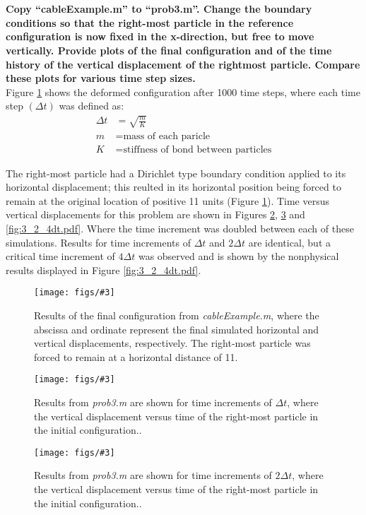 \documentclass[letterpaper, 10pt, oneside]{article}
\newenvironment{dd}[1]{
	\noindent
	\textbf{\normalsize{#1}}
	\hspace{0.1in}
	\small
	\rmfamily
	}
	{\medskip}
\newcommand{\as}[1]{\begin{align*}#1\end{align*}}
\newcommand{\bdd}{\begin{dd}}
\newcommand{\edd}{\end{dd}}
\newcommand{\Figure}[4]{
  \begin{figure}[#1]
    \centering
    \texttt{[image: figs/\#3]}
    \caption{#4.}\label{fig:#3}
  \end{figure}}
\begin{document}
\edd


\section{}
\bdd{Copy “cableExample.m” to “prob3.m”. Change the boundary conditions so that the right-most particle in the reference configuration is now fixed in the x-direction, but free to move vertically. Provide plots of the final configuration and of the time history of the vertical displacement of the rightmost particle. Compare these plots for various time step sizes.} \\

Figure \ref{fig:3_1.pdf} shows the deformed configuration after 1000 time steps, where each time step $(\Delta t)$ was defined as:
\as{\Delta t &= \sqrt{\frac{m}{K}} \\ m &= \text{mass of each paricle} \\ K &= \text{stiffness of bond between particles}}

The right-most particle had a Dirichlet type boundary condition applied to its horizontal displacement; this reulted in its horizontal position being forced to remain at the original location of positive 11 units (Figure \ref{fig:3_1.pdf}). Time versus vertical displacements for this problem are shown in Figures \ref{fig:3_2_1dt.pdf}, \ref{fig:3_2_2dt.pdf} and \ref{fig:3_2_4dt.pdf}. Where the time increment was doubled between each of these simulations.  Results for time increments of $\Delta t$ and $2\Delta t$ are identical, but a critical time increment of $4\Delta t$ was observed and is shown by the nonphysical results displayed in Figure \ref{fig:3_2_4dt.pdf}.

\Figure{htp}{4}{3_1.pdf}{Results of the final configuration from \emph{cableExample.m}, where the abscissa and ordinate represent the final simulated horizontal and vertical displacements, respectively.  The right-most particle was forced to remain at a horizontal distance of 11}

\Figure{htp}{4}{3_2_1dt.pdf}{Results from \emph{prob3.m} are shown for time increments of $\Delta t$, where the vertical displacement versus time of the right-most particle in the initial configuration.}

\Figure{htp}{4}{3_2_2dt.pdf}{Results from \emph{prob3.m} are shown for time increments of $2\Delta t$, where the vertical displacement versus time of the right-most particle in the initial configuration.}
\end{document}
